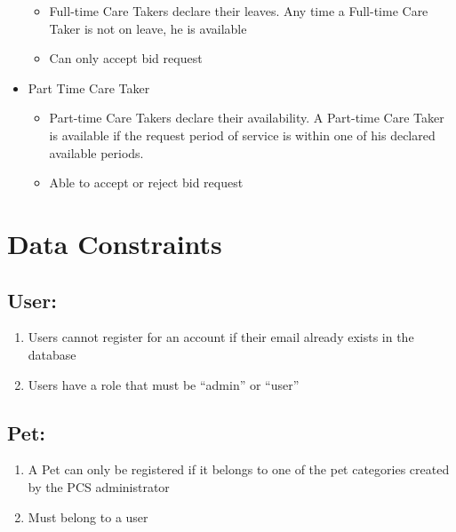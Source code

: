 \documentclass[
  paper=a4,
  ,captions=tableheading
]{scrartcl}
\providecommand{\tightlist}{%
  \setlength{\itemsep}{0pt}\setlength{\parskip}{0pt}}
\begin{document}
\begin{itemize}
  \begin{itemize}
  \tightlist
  \item
    Full-time Care Takers declare their leaves. Any time a Full-time
    Care Taker is not on leave, he is available
  \item
    Can only accept bid request
  \end{itemize}
\item
  Part Time Care Taker

  \begin{itemize}
  \tightlist
  \item
    Part-time Care Takers declare their availability. A Part-time Care
    Taker is available if the request period of service is within one of
    his declared available periods.
  \item
    Able to accept or reject bid request
  \end{itemize}
\end{itemize}

\hypertarget{data-constraints}{%
\section{Data Constraints}\label{data-constraints}}

\hypertarget{user}{%
\subsection{User:}\label{user}}

\begin{enumerate}
\def\labelenumi{\arabic{enumi}.}
\tightlist
\item
  Users cannot register for an account if their email already exists in
  the database
\item
  Users have a role that must be ``admin'' or ``user''
\end{enumerate}

\hypertarget{pet}{%
\subsection{Pet:}\label{pet}}

\begin{enumerate}
\def\labelenumi{\arabic{enumi}.}
\tightlist
\item
  A Pet can only be registered if it belongs to one of the pet
  categories created by the PCS administrator
\item
  Must belong to a user
\end{enumerate}
\end{document}

